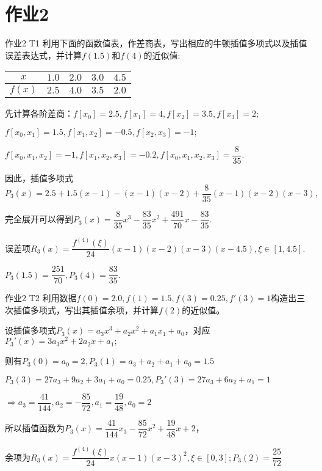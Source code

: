 \documentclass{beamer}
\begin{document}
\section{作业2}
    \begin{frame}{作业2 T1}
        利用下面的函数值表，作差商表，写出相应的牛顿插值多项式以及插值误差表达式，并计算$f(1.5)$和$f(4)$的近似值:
        \begin{table}[H]
            \begin{center}
                \begin{tabular}{|c|c|c|c|c|}
                \hline
                $x$ & $1.0$ & $2.0$ & $3.0$ & $4.5$ \\
                \hline
                $f(x)$ & $2.5$ & $4.0$ & $3.5$ & $2.0$ \\
                \hline
                \end{tabular}
            \end{center}
        \end{table}
        \pause 先计算各阶差商：$f[x_0]=2.5,f[x_1]=4,f[x_2]=3.5,f[x_3]=2;$

        \pause $f[x_0,x_1]=1.5,f[x_1,x_2]=-0.5,f[x_2,x_3]=-1;$

        \pause $f[x_0,x_1,x_2]=-1,f[x_1,x_2,x_3]=-0.2,f[x_0,x_1,x_2,x_3]=\dfrac{8}{35}.$

        \pause 因此，插值多项式$P_3(x)=2.5+1.5(x-1)-(x-1)(x-2)+\dfrac{8}{35}(x-1)(x-2)(x-3),$

        \pause 完全展开可以得到$P_3(x)=\dfrac{8}{35}x^3-\dfrac{83}{35}x^2+\dfrac{491}{70}x-\dfrac{83}{35}.$

        \pause 误差项$R_3(x)=\dfrac{f^{(4)}(\xi)}{24}(x-1)(x-2)(x-3)(x-4.5),\xi\in[1,4.5].$

        \pause $P_3(1.5)=\dfrac{251}{70},P_3(4)=\dfrac{83}{35}.$
    \end{frame}
    \begin{frame}{作业2 T2}
        利用数据$f(0)=2.0,f(1)=1.5,f(3)=0.25,f'(3)=1$构造出三次插值多项式，写出其插值余项，并计算$f(2)$的近似值。\vspace{1cm}

        \pause 设插值多项式$P_3(x)=a_{3}x^3+a_2 x^2+a_1 x_1+a_0$，对应$P_3 '(x)=3a_3 x^2+2a_2 x+a_1;$

        \pause 则有$P_3(0)=a_0=2,P_3(1)=a_3+a_2+a_1+a_0=1.5$

        \pause $P_3(3)=27a_3+9a_2+3a_1+a_0=0.25,P_3 '(3)=27a_3+6a_2+a_1=1$

        \pause $\Rightarrow a_3=\dfrac{41}{144},a_2=-\dfrac{85}{72},a_1=\dfrac{19}{48},a_0=2$

        \pause 所以插值函数为$P_3(x)=\dfrac{41}{144}x_3-\dfrac{85}{72}x^2+\dfrac{19}{48}x+2$，

        \pause 余项为$R_3(x)=\dfrac{f^{(4)}(\xi)}{24}x(x-1)(x-3)^2,\xi\in[0,3];P_3(2)=\dfrac{25}{72}$
    \end{frame}
\end{document}
